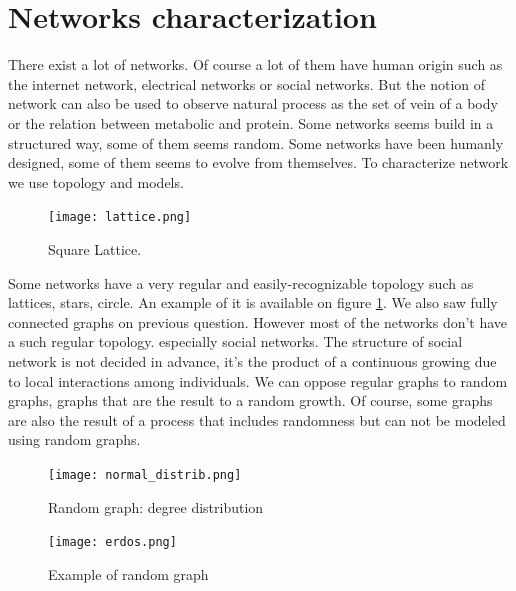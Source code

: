 \documentclass[a4paper, 12pt]{report}
\begin{document}
\section{Networks characterization}
There exist a lot of networks. Of course a lot of them have human origin such as the internet network, electrical networks or social networks. But the notion of network can also be used to observe natural process as the set of vein of a body or the relation between metabolic and protein. Some networks seems build in a structured way, some of them seems random. Some networks have been humanly designed, some of them seems to evolve from themselves. To characterize network we use topology and models.\\
\begin{figure}
\centering
\texttt{[image: lattice.png]}
\caption{Square Lattice. \citep{complex_networks} }
\label{lattice}
\end{figure}

Some networks have a very regular and easily-recognizable topology such as lattices, stars, circle. An example of it is available on figure \ref{lattice}. We also saw fully connected graphs on previous question. However most of the networks don't have a such regular topology. especially social networks. The structure of social network is not decided in advance, it's the product of a continuous growing due to local interactions among individuals. We can oppose regular graphs to random graphs, graphs that are the result to a random growth. Of course, some graphs are also the result of a process that includes randomness but can not be modeled using random graphs.\\
\begin{figure}
\centering
\texttt{[image: normal\_distrib.png]}
\caption{Random graph: degree distribution}
\label{random}
\end{figure}

\begin{figure}
\centering
\texttt{[image: erdos.png]}
\caption{Example of random graph\citep{erdos_image}}
\label{erdos}
\end{figure}
\end{document}
